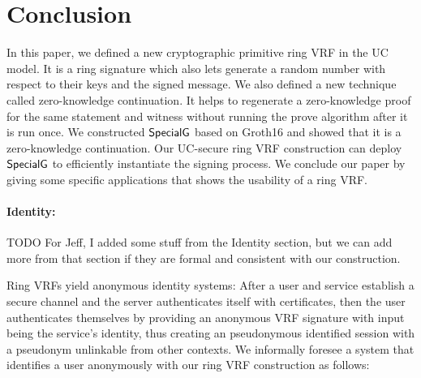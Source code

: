 \section{Conclusion}
\label{sec:conclusion}

In this paper,  we defined a new cryptographic primitive ring VRF in the UC model. It is a ring signature which also lets generate a random number with respect to their keys and the signed message. We  also defined a new technique called zero-knowledge continuation. It helps to regenerate a zero-knowledge proof for the same statement and witness without running the prove algorithm after it is run once. We constructed  $ {\mathsf{SpecialG}} $ based on Groth16 \cite{Groth16} and showed that it is a zero-knowledge continuation. Our UC-secure ring VRF construction can deploy $ {\mathsf{SpecialG}} $ to efficiently instantiate the signing process. 
We conclude our paper by giving some specific applications that shows the usability of a ring VRF.

\paragraph{Identity:} 
TODO For Jeff, I added some stuff from the Identity section, but we can add more from that section if they are formal and consistent with our construction.

 Ring VRFs yield anonymous identity systems:
After a user and service establish a secure channel and
the server authenticates itself with certificates, then
the user authenticates themselves by providing an anonymous
VRF signature with input \msg being the service's identity,
thus creating an pseudonymous identified session with
a pseudonym unlinkable from other contexts. We informally foresee a system that identifies a user anonymously with our ring VRF construction as follows:


